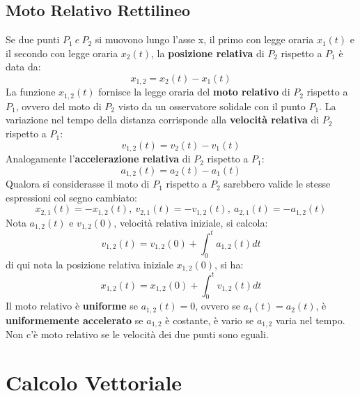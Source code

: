 \documentclass{article}
\numberwithin{equation}{subsection}
\begin{document}
\subsection{Moto Relativo Rettilineo}
Se due punti $P_1 \ e \ P_2$ si muovono lungo l'asse x, il primo con legge oraria $x_1(t)$ e il secondo con legge oraria $x_2(t)$, la \textbf{posizione relativa} di $P_2$ rispetto a $P_1$ è data da:
\begin{equation}
    x_{1,2}=x_2(t)-x_1(t)
\end{equation}
La funzione $x_{1,2}(t)$ fornisce la legge oraria del \textbf{moto relativo} di $P_2$ rispetto a $P_1$, ovvero del moto di $P_2$ visto da un osservatore solidale con il punto $P_1$. La variazione nel tempo della distanza corrisponde alla \textbf{velocità relativa} di $P_2$ rispetto a $P_1$:
\begin{equation}
    v_{1,2}(t)= v_2(t)-v_1(t)
\end{equation}
Analogamente l'\textbf{accelerazione relativa} di $P_2$ rispetto a $P_1$:
\begin{equation}
    a_{1,2}(t)= a_2(t)-a_1(t)
\end{equation}
Qualora si considerasse il moto di $P_1$ rispetto a $P_2$ sarebbero valide le stesse espressioni col segno cambiato:
\begin{equation}
    x_{2,1}(t)=-x_{1,2}(t), \ v_{2,1}(t)=-v_{1,2}(t), \ a_{2,1}(t)=-a_{1,2}(t)
\end{equation}
Nota $a_{1,2}(t)$ e $v_{1,2}(0)$, velocità relativa iniziale, si calcola:
\begin{equation}
    v_{1,2}(t)=v_{1,2}(0) + \int_0^t a_{1,2}(t)dt
\end{equation}
di qui nota la posizione relativa iniziale $x_{1,2}(0)$, si ha:
\begin{equation}
    x_{1,2}(t)=x_{1,2}(0) + \int_0^t v_{1,2}(t)dt
\end{equation}
Il moto relativo è \textbf{uniforme} se $a_{1,2}(t)=0$, ovvero se $a_1(t)=a_2(t)$, è \textbf{uniformemente accelerato} se $a_{1,2}$ è costante, è vario se $a_{1,2}$ varia nel tempo. Non c'è moto relativo se le velocità dei due punti sono eguali.
\section{Calcolo Vettoriale}
\end{document}
